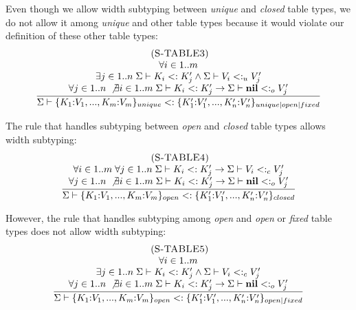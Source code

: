 Even though we allow width subtyping between \emph{unique} and \emph{closed}
table types, we do not allow it among \emph{unique} and other table types
because it would violate our definition of these other table types:
\[
\begin{array}{c}
\; (\textsc{S-TABLE3})\\
\dfrac{\begin{array}{c}
       \forall i \in 1..m \\
       \exists j \in 1..n \;
       \Sigma \vdash K_{i} <: K_{j}' \land \Sigma \vdash V_{i} <:_{u} V_{j}' \\
       \forall j \in 1..n \; \not\exists i \in 1..m \;
       \Sigma \vdash K_{i} <: K_{j}' \to \Sigma \vdash \mathbf{nil} <:_{o} V_{j}'
       \end{array}}
      {\Sigma \vdash \{K_{1}{:}V_{1}, ..., K_{m}{:}V_{m}\}_{unique} <:
                    \{K_{1}'{:}V_{1}', ..., K_{n}'{:}V_{n}'\}_{unique|open|fixed}}
\end{array}
\]

The rule that handles subtyping between \emph{open} and \emph{closed} table
types allows width subtyping:
\[
\begin{array}{c}
\; (\textsc{S-TABLE4})\\
\dfrac{\begin{array}{c}
       \forall i \in 1..m \; \forall j \in 1..n \;
       \Sigma \vdash K_{i} <: K_{j}' \to \Sigma \vdash V_{i} <:_{c} V_{j}' \\
       \forall j \in 1..n \; \not\exists i \in 1..m \;
       \Sigma \vdash K_{i} <: K_{j}' \to \Sigma \vdash \mathbf{nil} <:_{o} V_{j}'
       \end{array}}
      {\Sigma \vdash \{K_{1}{:}V_{1}, ..., K_{m}{:}V_{m}\}_{open} <:
                    \{K_{1}'{:}V_{1}', ..., K_{n}'{:}V_{n}'\}_{closed}}
\end{array}
\]

However, the rule that handles subtyping among \emph{open} and
\emph{open} or \emph{fixed} table types does not allow width subtyping:
\[
\begin{array}{c}
\; (\textsc{S-TABLE5})\\
\dfrac{\begin{array}{c}
       \forall i \in 1..m \\
       \exists j \in 1..n \;
       \Sigma \vdash K_{i} <: K_{j}' \land \Sigma \vdash V_{i} <:_{c} V_{j}' \\
       \forall j \in 1..n \; \not\exists i \in 1..m \;
       \Sigma \vdash K_{i} <: K_{j}' \to \Sigma \vdash \mathbf{nil} <:_{o} V_{j}'
       \end{array}}
      {\Sigma \vdash \{K_{1}{:}V_{1}, ..., K_{m}{:}V_{m}\}_{open} <:
                    \{K_{1}'{:}V_{1}', ..., K_{n}'{:}V_{n}'\}_{open|fixed}}
\end{array}
\]

